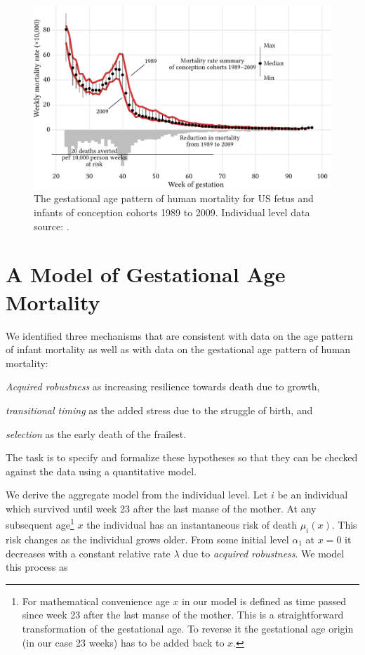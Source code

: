 \documentclass[12pt, parskip=half]{scrartcl}
\begin{document}
\begin{figure}[!htb]
  \centering
  \includegraphics[width = \textwidth]{./fig/us_fimort_obsmx_1989_2009.pdf}
  \caption{The gestational age pattern of human mortality for US fetus and infants of conception cohorts 1989 to 2009. Individual level data source: \cite{DVS2015}.}
  \label{fig:us_fimort_1989_2009_mx}
\end{figure}

\section{A Model of Gestational Age Mortality} %
\label{sec:modelling_the_gestational_age_pattern_of_human_mortality}

We identified three mechanisms that are consistent with data on the age pattern of infant mortality as well as with data on the gestational age pattern of human mortality:
\begin{inparaenum}
  \item \emph{Acquired robustness} as increasing resilience towards death due to growth,
  \item \emph{transitional timing} as the added stress due to the struggle of birth, and
  \item \emph{selection} as the early death of the frailest.
\end{inparaenum}
The task is to specify and formalize these hypotheses so that they can be checked against the data using a quantitative model.

We derive the aggregate model from the individual level. Let $i$ be an individual which survived until week 23 after the last manse of the mother. At any subsequent age\footnote{For mathematical convenience age $x$ in our model is defined as time passed since week 23 after the last manse of the mother. This is a straightforward transformation of the gestational age. To reverse it the gestational age origin (in our case 23 weeks) has to be added back to $x$.} $x$ the individual has an instantaneous risk of death $\mu_i(x)$. This risk changes as the individual grows older. From some initial level $\alpha_1$ at $x = 0$ it decreases with a constant relative rate $\lambda$ due to \emph{acquired robustness}. We model this process as
\end{document}
